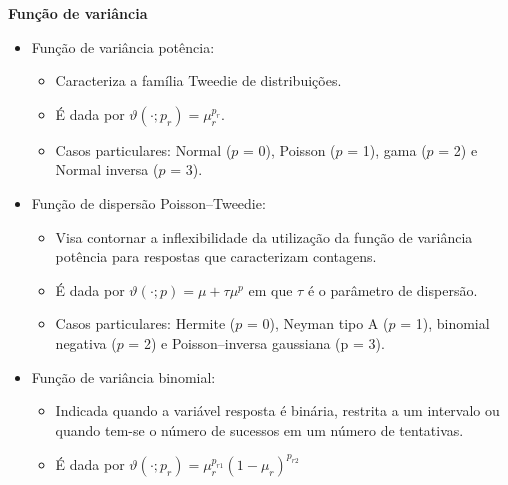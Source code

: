 \documentclass[10pt,
  aspectratio=169,
  serif,
  mathserif,
  professionalfont,
  compress,
  handout,
  ]{beamer}\usepackage[]{graphicx}\usepackage[]{color}
\begin{document}
\begin{frame}[c, allowframebreaks]

\textbf{Função de variância}

\begin{itemize}
  
  \item Função de variância potência: 
  
  \begin{itemize}
    
    \item Caracteriza a família Tweedie de distribuições. 
    
    \item É dada por $\vartheta\left(\cdot; p_r\right) = \mu^{p_r}_r$.
    
    \item Casos particulares: Normal ($p$ = 0), Poisson ($p$ = 1), gama ($p$ = 2) e  Normal inversa ($p$ = 3).
    
  \end{itemize}
  
  \item Função de dispersão Poisson–Tweedie:
  
  \begin{itemize}
    
    \item Visa contornar a inflexibilidade da utilização da função de variância potência para respostas que caracterizam contagens. 
    
    \item É dada por $\vartheta\left(\cdot; p\right) = \mu + \tau\mu^p$ em que $\tau$ é o parâmetro de dispersão.
    
    \item Casos particulares: Hermite ($p$ = 0), Neyman tipo A ($p$ = 1), binomial negativa ($p$ = 2) e Poisson–inversa gaussiana (p = $3$).
  
  \end{itemize}

  \item Função de variância binomial: 
  
  \begin{itemize}
    
    \item Indicada quando a variável resposta é binária, restrita a um intervalo ou quando tem-se o número de sucessos em um número de tentativas.
    
    \item É dada por $\vartheta\left(\cdot; p_r\right) = \mu^{p_{r1}}_r(1 - \mu_r)^{p_{r2}}$ 
    
  \end{itemize}

  
\end{itemize}


\end{frame}
\end{document}
